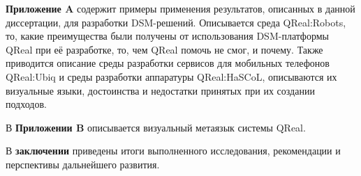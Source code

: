 \textbf{Приложение A} содержит примеры применения результатов, описанных в данной 
диссертации, для разработки DSM-решений. Описывается среда QReal:Robots, то, какие 
преимущества были получены от использования DSM-платформы QReal при её разработке, 
то, чем QReal помочь не смог, и почему. Также приводится описание среды разработки 
сервисов для мобильных телефонов QReal:Ubiq и среды разработки аппаратуры QReal:HaSCoL, 
описываются их визуальные языки, достоинства и недостатки принятых при их создании подходов.

В \textbf{Приложении B} описывается визуальный метаязык системы QReal.

В \textbf{заключении} приведены итоги выполненного исследования, рекомендации и перспективы дальнейшего развития.
